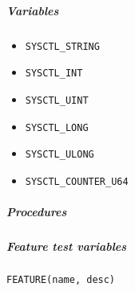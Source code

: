 \subparagraph{Variables}
\begin{itemize}
\item \verb+SYSCTL_STRING+
\item \verb+SYSCTL_INT+
\item \verb+SYSCTL_UINT+
\item \verb+SYSCTL_LONG+
\item \verb+SYSCTL_ULONG+
\item \verb+SYSCTL_COUNTER_U64+
\end{itemize}

\subparagraph{Procedures}


\subparagraph{Feature test variables}
\verb+FEATURE(name, desc)+
